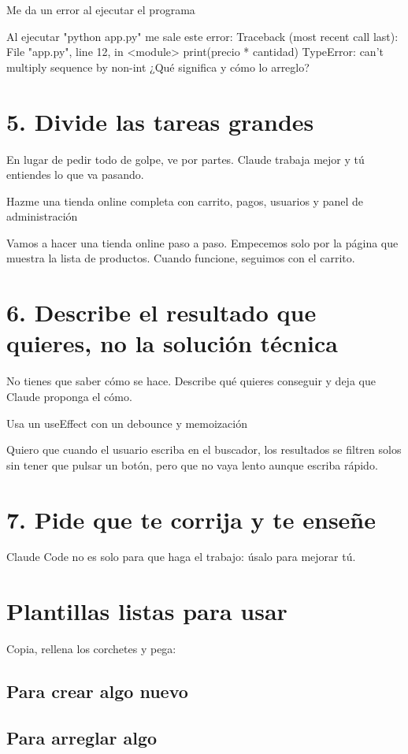 \documentclass[11pt,a4paper]{book}
\begin{document}
Me da un error al ejecutar el programa

Al ejecutar "python app.py" me sale este error: Traceback (most recent call last): File "app.py", line 12, in <module> print(precio * cantidad) TypeError: can't multiply sequence by non-int ¿Qué significa y cómo lo arreglo?

\section{5. Divide las tareas grandes}
En lugar de pedir todo de golpe, ve por partes. Claude trabaja mejor y tú entiendes lo que va pasando.

Hazme una tienda online completa con carrito, pagos, usuarios y panel de administración

Vamos a hacer una tienda online paso a paso. Empecemos solo por la página que muestra la lista de productos. Cuando funcione, seguimos con el carrito.

\section{6. Describe el resultado que quieres, no la solución técnica}
No tienes que saber cómo se hace. Describe qué quieres conseguir y deja que Claude proponga el cómo.

Usa un useEffect con un debounce y memoización

Quiero que cuando el usuario escriba en el buscador, los resultados se filtren solos sin tener que pulsar un botón, pero que no vaya lento aunque escriba rápido.

\section{7. Pide que te corrija y te enseñe}
Claude Code no es solo para que haga el trabajo: úsalo para mejorar tú.

\section{Plantillas listas para usar}
Copia, rellena los corchetes y pega:

\subsection{Para crear algo nuevo}
\subsection{Para arreglar algo}
\end{document}
